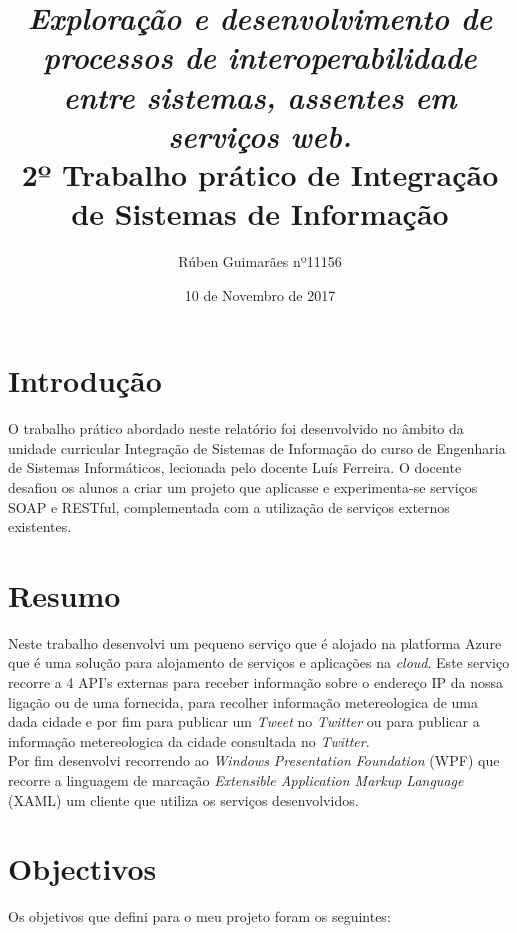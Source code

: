 \documentclass[11pt]{report}
\title{\textbf{\textit{Exploração e desenvolvimento  de processos de interoperabilidade entre sistemas, assentes em serviços web.}\\
		\large2º Trabalho prático de
		Integração de Sistemas de Informação}}
\author{Rúben Guimarães nº11156}
\affil{Escola Superior de Tecnologia, IPCA \\
	Barcelos}
\date{10 de Novembro de 2017}
\begin{document}
\maketitle




\tableofcontents


\chapter*{Introdução}

O trabalho prático abordado neste relatório foi desenvolvido no âmbito da unidade curricular Integração de Sistemas de Informação do curso de Engenharia de Sistemas Informáticos, lecionada pelo docente Luís Ferreira. O docente desafiou os alunos a criar um projeto que aplicasse e experimenta-se serviços SOAP e RESTful, complementada com a utilização de serviços externos existentes.

\clearpage



\chapter*{Resumo}

Neste trabalho desenvolvi um pequeno serviço que é alojado na platforma Azure que é uma solução para alojamento de serviços e aplicações na \textit{cloud}. 
Este serviço recorre a 4 API's externas para receber informação sobre o endereço IP da nossa ligação ou de uma fornecida, para recolher informação metereologica de uma dada cidade e por fim para publicar um \textit{Tweet} no \textit{Twitter} ou para publicar a informação metereologica da cidade consultada no \textit{Twitter}.\\ Por fim desenvolvi recorrendo ao \textit{Windows Presentation Foundation} (WPF) que recorre a linguagem de marcação \textit{Extensible Application Markup Language} (XAML) um cliente que utiliza os serviços desenvolvidos.

\clearpage


\chapter*{Objectivos}

Os objetivos que defini para o meu projeto foram os seguintes:
\end{document}
